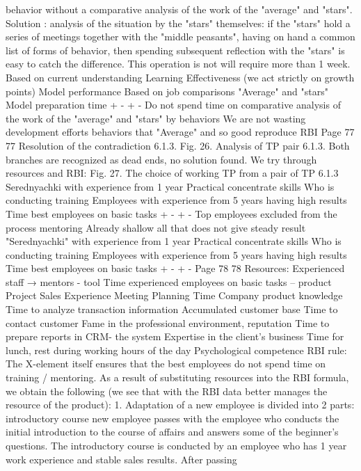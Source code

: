 behavior without a comparative analysis of the work of the "average" and "stars".
Solution : analysis of the situation by the "stars" themselves: if the "stars" hold a series of meetings
together with the "middle peasants", having on hand a common list of forms of behavior, then spending
subsequent reflection with the "stars" is easy to catch the difference. This operation is not
will require more than 1 week.
Based on
current understanding
Learning Effectiveness
(we act strictly on
growth points)
Model
performance
Based on
job comparisons
"Average" and "stars"
Model preparation time
+
-
+
-
Do not spend time on comparative
analysis of the work of the "average" and "stars" by
behaviors
We are not wasting development efforts
behaviors that
"Average" and so good
reproduce
RBI
Page 77
77
Resolution of the contradiction 6.1.3.
Fig. 26. Analysis of TP pair 6.1.3.
Both branches are recognized as dead ends, no solution found.
We try through resources and RBI:
Fig. 27. The choice of working TP from a pair of TP 6.1.3
Serednyachki with experience from
1 year
Practical concentrate
skills
Who is conducting
training
Employees with experience from 5
years having high
results
Time best employees on
basic tasks
+
-
+
-
Top employees excluded from the process
mentoring
Already shallow all that does not give
steady result
"Serednyachki" with experience from
1 year
Practical concentrate
skills
Who is conducting
training
Employees with experience from 5
years having high
results
Time best employees on
basic tasks
+
-
+
-
Page 78
78
Resources:
Experienced staff → mentors -
tool
Time
experienced
employees
on
basic tasks -- product
Project Sales Experience
Meeting Planning Time
Company product knowledge
Time to analyze transaction information
Accumulated customer base
Time to contact customer
Fame in the professional environment,
reputation
Time to prepare reports in CRM-
the system
Expertise in the client’s business
Time for lunch, rest during working hours
of the day
Psychological competence
RBI rule:
The X-element itself ensures that the best employees do not spend time on
training / mentoring.
As a result of substituting resources into the RBI formula, we obtain the following (we see that with
the RBI data better manages the resource of the product):
1. Adaptation of a new employee is divided into 2 parts: introductory course new employee
passes with the employee who conducts the initial introduction to the course of affairs and
answers some of the beginner's questions. The introductory course is conducted by an employee who has
1 year work experience and stable sales results. After passing
